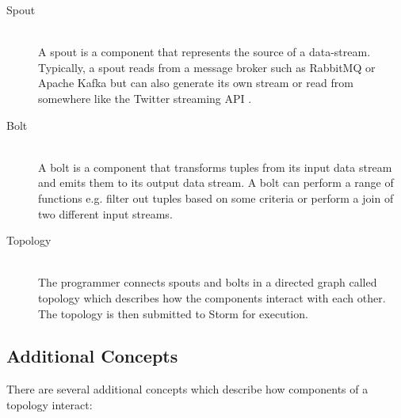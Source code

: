\documentclass[bsc,twoside,singlespacing,normalheadings,parskip]{infthesis}\usepackage[]{graphicx}\usepackage[]{color}
\begin{document}
\begin{description}
  \item[Spout] \hfill \\
  A spout is a component that represents the source of a data-stream. Typically, a spout reads from a message broker such as RabbitMQ \cite{RabbitMQ} or Apache Kafka but can also generate its own stream or read from somewhere like the Twitter streaming API \citep{TwitterStreaming}.
  \item[Bolt] \hfill \\
  A bolt is a component that transforms tuples from its input data stream and emits them to its output data stream. A bolt can perform a range of functions e.g. filter out tuples based on some criteria or perform a join of two different input streams.
  \item[Topology] \hfill \\
  The programmer connects spouts and bolts in a directed graph called topology which describes how the components interact with each other. The topology is then submitted to Storm for execution.
\end{description}

\subsection{Additional Concepts}

There are several additional concepts which describe how components of a topology interact:
\end{document}
